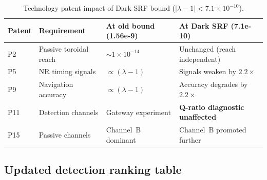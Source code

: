 \documentclass[11pt]{article}
\newcommand{\lam}{\lambda}
\newcommand{\lbone}{|\lambda - 1|}
\newcommand{\ee}[1]{\times 10^{#1}}
\theoremstyle{definition}
\theoremstyle{remark}
\begin{document}
\begin{table}[H]
\centering
\caption{Technology patent impact of Dark SRF bound ($\lbone < 7.1\ee{-10}$).}
\label{tab:patent_impact}
\renewcommand{\arraystretch}{1.3}
\begin{tabular}{@{}p{1.5cm}p{3cm}p{4cm}p{4cm}@{}}
\toprule
\textbf{Patent} & \textbf{Requirement} & \textbf{At old bound (1.56e-9)} &
  \textbf{At Dark SRF (7.1e-10)} \\
\midrule
P2 & Passive toroidal reach & $\sim 1\ee{-14}$ & Unchanged (reach independent) \\
P5 & NR timing signals & $\propto (\lam-1)$ & Signals weaken by $2.2\times$ \\
P9 & Navigation accuracy & $\propto (\lam-1)$ & Accuracy degrades by $2.2\times$ \\
P11 & Detection channels & Gateway experiment & \textbf{Q-ratio diagnostic
  unaffected} \\
P15 & Passive channels & Channel~B dominant & Channel~B promoted further \\
\bottomrule
\end{tabular}
\end{table}

\subsection{Updated detection ranking table}
\end{document}
